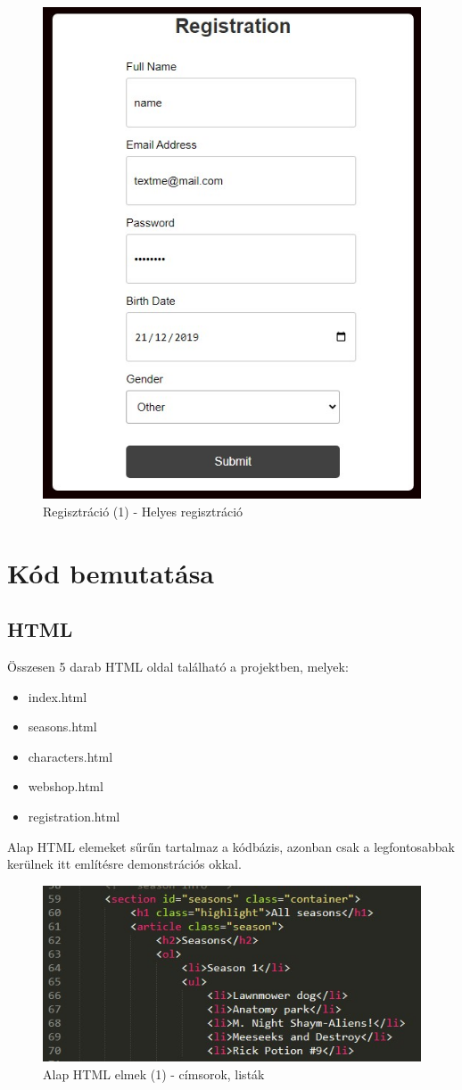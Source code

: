 \documentclass[12pt, titlepage]{article}
\begin{document}
\begin{figure}[!h]
	\centering
	\includegraphics[width=0.7\linewidth]{images/signup/2.jpg}
	\caption{Regisztráció (1) - Helyes regisztráció}
\end{figure}

\pagebreak

\section{Kód bemutatása}
\subsection{HTML}
Összesen 5 darab HTML oldal található a projektben, melyek:
\begin{itemize}
	\item{index.html}
	\item{seasons.html}
	\item{characters.html}
	\item{webshop.html}
	\item{registration.html}
\end{itemize}

Alap HTML elemeket sűrűn tartalmaz a kódbázis, azonban csak a legfontosabbak kerülnek itt említésre demonstrációs okkal.

\begin{figure}[!h]
	\centering
	\includegraphics[width=\linewidth]{images/html/1.jpg}
	\caption{Alap HTML elmek (1) - címsorok, listák}
\end{figure}
\end{document}
